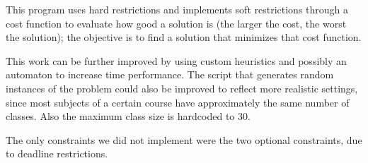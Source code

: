 \documentclass[runningheads]{llncs}
\begin{document}
This program uses hard restrictions and implements soft restrictions through a cost function to evaluate how good a solution is (the larger the cost, the worst the solution); the objective is to find a solution that minimizes that cost function.

This work can be further improved by using custom heuristics and possibly an automaton to increase time performance.
The script that generates random instances of the problem could also be improved to reflect more realistic settings, since most subjects of a certain course have approximately the same number of classes.
Also the maximum class size is hardcoded to 30.

The only constraints we did not implement were the two optional constraints, due to deadline restrictions.

%
%



\end{document}
